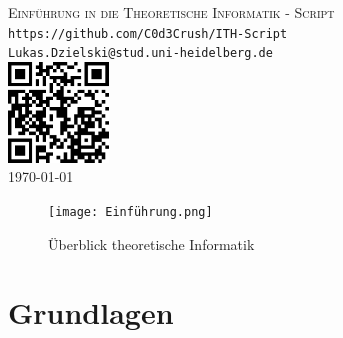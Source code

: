 \documentclass[a4paper,11pt]{article}
\begin{document}
\begin{titlepage}
    \centering
    \vspace*{2cm}
  
    \vspace{1cm}
  
    \textsc{\Large Einführung in die Theoretische Informatik - Script}\\[1.5cm]
    
    \texttt{\large https://github.com/C0d3Crush/ITH-Script}\\
    \texttt{\large Lukas.Dzielski@stud.uni-heidelberg.de}\\[2cm]

    \includegraphics[width=0.2\textwidth]{qrcode.png}\\[10cm]

  
    {\large \today}\\[2cm]
  
    \vfill
  
  \end{titlepage}
\begin{figure}
    \centering
    \texttt{[image: Einführung.png]}
    \caption{Überblick theoretische Informatik}
    \label{fig:example}
\end{figure}

\section{Grundlagen}
\end{document}
